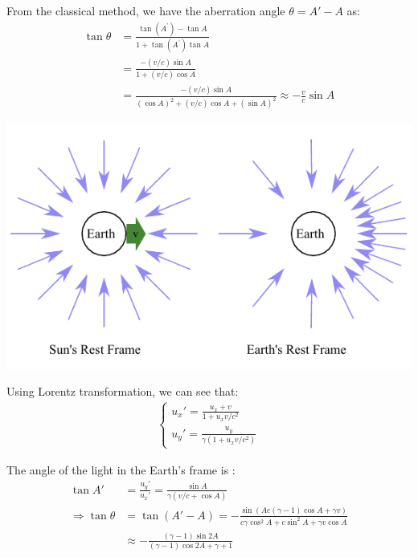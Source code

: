 \documentclass[]{ctexart}
\begin{document}
			From the classical method, we have the aberration angle $\theta=A'-A$ as:
				\begin{equation*}
				\begin{aligned}
					\tan\theta&=\frac{\tan \left(A^{\prime}\right)-\tan A}{1+\tan \left(A^{\prime}\right) \tan A}\\
					&=\frac{-(v / c) \sin A}{1+(v / c) \cos A}\\
					&=\frac{-(v / c) \sin A}{(\cos A)^{2}+(v / c) \cos A+(\sin A)^{2}}\approx -\frac{v}{c}\sin A
				\end{aligned}
				\end{equation*}
			
				\begin{center}
					\includegraphics[scale=1]{sun-earth-aberration.pdf}
				\end{center}
		
			Using Lorentz transformation, we can see that:
				\begin{equation*}
				\begin{aligned}
					\begin{cases}
					u_x'=\frac{u_x+v}{1+u_xv/c^2}\\
					u_y'=\frac{u_y}{\gamma(1+u_xv/c^2)}
					\end{cases}
				\end{aligned}
				\end{equation*}
			
			The angle of the light in the Earth's frame is :
				\begin{equation*}
				\begin{aligned}
					\tan A'&=\frac{u_y'}{u_x'}=\frac{\sin A}{\gamma(v/c+\cos A)}\\
					\Rightarrow \tan \theta&=\tan (A'-A)=-\frac{\sin (A c (\gamma -1) \cos A+\gamma  v)}{c \gamma  \cos ^2A+c \sin ^2A+\gamma  v \cos A}\\
					&\approx -\frac{(\gamma -1) \sin 2 A}{(\gamma -1) \cos 2 A+\gamma +1}
				\end{aligned}
				\end{equation*}
		
\end{document}
